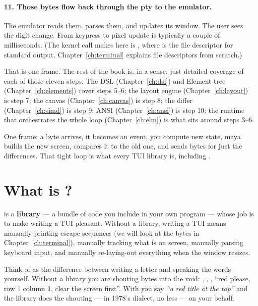 \paragraph{11. Those bytes flow back through the pty to the emulator.}
The emulator reads them, parses them, and updates its window. The
user sees the digit change. From keypress to pixel update is
typically a couple of milliseconds. (The kernel call \maya{}
makes here is , where  is the file
descriptor for standard output. Chapter~\ref{ch:terminal} explains
file descriptors from scratch.)

That is one frame. The rest of the book is, in a sense, just
detailed coverage of each of those eleven steps. The DSL
(Chapter~\ref{ch:dsl}) and Element tree
(Chapter~\ref{ch:elements}) cover steps 5--6; the layout engine
(Chapter~\ref{ch:layout}) is step 7; the canvas
(Chapter~\ref{ch:canvas}) is step 8; the differ
(Chapter~\ref{ch:simd}) is step 9; ANSI
(Chapter~\ref{ch:ansi}) is step 10; the runtime that orchestrates
the whole loop (Chapter~\ref{ch:elm}) is what sits around steps
3--6.

\begin{idea}
One frame: a byte arrives, it becomes an event, you compute new
state, maya builds the new screen, compares it to the old one, and
sends bytes for just the differences. That tight loop is what every
TUI library is, including \maya{}.
\end{idea}

\section{What is \maya{}?}

\maya{} is a \cpp{} \textbf{library} --- a bundle of code you include
in your own program --- whose job is to make writing a TUI pleasant.
Without a library, writing a TUI means manually printing escape
sequences (we will look at the bytes in Chapter~\ref{ch:terminal}),
manually tracking what is on screen, manually parsing keyboard input,
and manually re-laying-out everything when the window resizes.

Think of \maya{} as the difference between writing a letter and
speaking the words yourself. Without a library you are shouting bytes
into the void: \code{ESC[2J}, \code{ESC[H}, \code{ESC[31m}, ``red
please, row 1 column 1, clear the screen first''. With \maya{} you
say \emph{``a red title at the top''} and the library does the
shouting --- in 1978's dialect, no less --- on your behalf.

